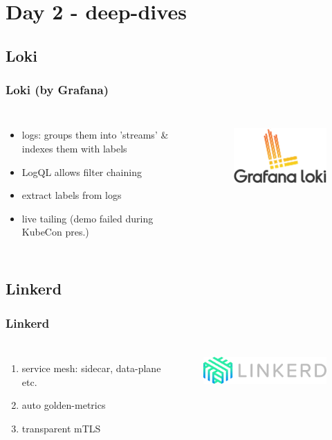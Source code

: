 \documentclass[default]{beamer}
\begin{document}
\section{Day 2 - deep-dives}


\subsection{Loki}
\begin{frame}
  \frametitle{Loki (by Grafana)\footnotemark}
  \begin{columns}
    \column{2in}
    \begin{itemize}
      \item logs: groups them into 'streams' \& indexes them with labels
      \item LogQL allows filter chaining
      \item extract labels from logs
      \item live tailing (demo failed during KubeCon pres.)
    \end{itemize}
    \column{2in}
    \begin{figure}
      \includegraphics[width=150pt,height=80pt]{src/kubecon/static/loki.png}
    \end{figure}
  \end{columns}
\end{frame}

\subsection{Linkerd}
\begin{frame}
  \frametitle{Linkerd\footnotemark}
  \begin{columns}
    \column{2in}
    \begin{enumerate}
      \item service mesh: sidecar, data-plane etc.
      \item auto golden-metrics
      \item transparent mTLS
    \end{enumerate}
    \column{2in}
    \begin{figure}
      \includegraphics[width=150pt,height=40pt]{src/kubecon/static/linkerd.png}
    \end{figure}
  \end{columns}
\end{frame}
\end{document}
